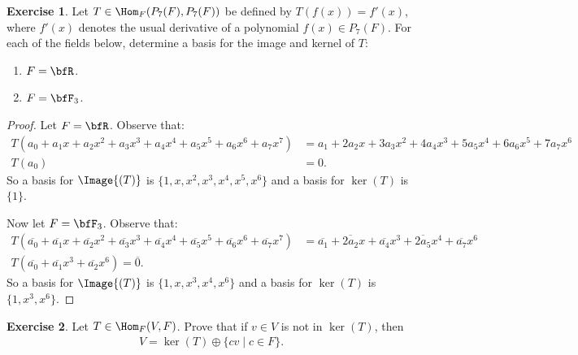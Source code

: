 \documentclass[9pt,twoside,openany]{memoir}
\theoremstyle{plain}
\theoremstyle{definition}
\newtheorem{exercise}{Exercise}
\theoremstyle{remark}
\numberwithin{equation}{section}
\begin{document}
    \addtocounter{exercise}{9}
    \begin{exercise}
        Let $T \in \Hom_F{(P_7(F),P_7(F))}$ be defined by $T(f(x)) = f'(x)$, where $f'(x)$ denotes the usual derivative of a polynomial $f(x) \in P_7(F)$. For each of the fields below, determine a basis for the image and kernel of $T$:
            \begin{enumerate}[label = (\alph*)]
                \item $F = \bfR$.
                \item $F = \bfF_3$.
            \end{enumerate}
    \end{exercise}
        \begin{proof}
            Let $F = \bfR$. Observe that:
                \begin{equation*}
                \begin{split}
                    T(a_0 + a_1 x + a_2 x^2 + a_3 x^3 + a_4 x^4 + a_5 x^5  + a_6 x^6 + a_7 x^7) &= a_1  + 2a_2 x + 3a_3 x^2 + 4a_4 x^3 + 5a_5 x^4  + 6a_6 x^5 + 7a_7 x^6 \\
                    T(a_0) &= 0.
                \end{split}
                \end{equation*}
            So a basis for $\Image{(T)}$ is $\{1,x,x^2,x^3,x^4,x^5,x^6 \}$ and a basis for $\ker{(T)}$ is $\{1\}$.

            Now let $F = \bfF_3$. Observe that:
                \begin{equation*}
                \begin{split}
                    T(\overline{a_0} + \overline{a_1} x + \overline{a_2} x^2 + \overline{a_3} x^3 + \overline{a_4} x^4 + \overline{a_5} x^5  + \overline{a_6} x^6 + \overline{a_7} x^7) &= \overline{a_1} + \overline{2 a_2} x + \overline{a_4} x^3 + \overline{2a_5} x^4 + \overline{a_7}x^6\\
                    T(\overline{a_0} + \overline{a_1}x^3 + \overline{a_2}x^6) = \overline{0}.
                \end{split}
                \end{equation*}
                So a basis for $\Image{(T)}$ is $\{1,x,x^3,x^4,x^6\}$ and a basis for $\ker{(T)}$ is $\{1,x^3,x^6\}$.
        \end{proof}
    \begin{exercise}
        Let $T \in \Hom_F{(V,F)}$. Prove that if $v \in V$ is not in $\ker{(T)}$, then
            \begin{equation*}
            \begin{split}
                V = \ker{(T)} \oplus \{cv \mid c \in F\}.
            \end{split}
            \end{equation*}
    \end{exercise}
\end{document}
